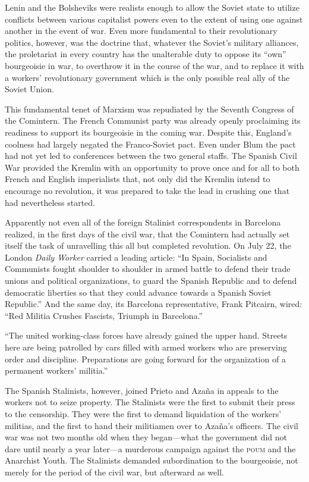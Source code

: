 Lenin and the Bolsheviks were realists enough to allow the Soviet state to utilize conflicts between various capitalist powers even to the extent of using one against another in the event of war. Even more fundamental to their revolutionary politics, however, was the doctrine that, whatever the Soviet’s military alliances, the proletariat in every country has the unalterable duty to oppose its ``own'' bourgeoisie in war, to overthrow it in the course of the war, and to replace it with a workers’ revolutionary government which is the only possible real ally of the Soviet Union.

This fundamental tenet of Marxism was repudiated by the Seventh Congress of the Comintern. The French Communist party was already openly proclaiming its readiness to support its bourgeoisie in the coming war. Despite this, England’s coolness had largely negated the Franco-Soviet pact. Even under Blum the pact had not yet led to conferences between the two general staffs. The Spanish Civil War provided the Kremlin with an opportunity to prove once and for all to both French and English imperialists that, not only did the Kremlin intend to encourage no revolution, it was prepared to take the lead in crushing one that had nevertheless started.

Apparently not even all of the foreign Stalinist correspondents in Barcelona realized, in the first days of the civil war, that the Comintern had actually set itself the task of unravelling this all but completed revolution. On July 22, the London \emph{Daily Worker} carried a leading article: ``In Spain, Socialists and Communists fought shoulder to shoulder in armed battle to defend their trade unions and political organizations, to guard the Spanish Republic and to defend democratic liberties so that they could advance towards a Spanish Soviet Republic.'' And the same day, its Barcelona representative, Frank Pitcairn, wired: ``Red Militia Crushes Fascists, Triumph in Barcelona.''

``The united working-class forces have already gained the upper hand. Streets here are being patrolled by cars filled with armed workers who are preserving order and discipline. Preparations are going forward for the organization of a permanent workers’ militia.''

The Spanish Stalinists, however, joined Prieto and Azaña in appeals to the workers not to seize property. The Stalinists were the first to submit their press to the censorship. They were the first to demand liquidation of the workers’ militias, and the first to hand their militiamen over to Azaña’s officers. The civil war was not two months old when they began---what the government did not dare until nearly a year later---a murderous campaign against the \textsc{poum} and the Anarchist Youth. The Stalinists demanded subordination to the bourgeoisie, not merely for the period of the civil war, but afterward as well.

